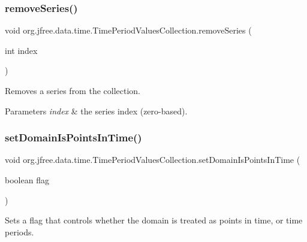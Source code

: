 \subsubsection{\texorpdfstring{remove\+Series()}{removeSeries()}\hspace{0.1cm}{\footnotesize\ttfamily [2/2]}}
{\footnotesize\ttfamily void org.\+jfree.\+data.\+time.\+Time\+Period\+Values\+Collection.\+remove\+Series (\begin{DoxyParamCaption}\item[{int}]{index }\end{DoxyParamCaption})}

Removes a series from the collection.


\begin{DoxyParams}{Parameters}
{\em index} & the series index (zero-\/based). \\
\hline
\end{DoxyParams}
\mbox{\label{classorg_1_1jfree_1_1data_1_1time_1_1_time_period_values_collection_a6b02c47571098c6cec37871815af991a}} 
\subsubsection{\texorpdfstring{set\+Domain\+Is\+Points\+In\+Time()}{setDomainIsPointsInTime()}}
{\footnotesize\ttfamily void org.\+jfree.\+data.\+time.\+Time\+Period\+Values\+Collection.\+set\+Domain\+Is\+Points\+In\+Time (\begin{DoxyParamCaption}\item[{boolean}]{flag }\end{DoxyParamCaption})}

Sets a flag that controls whether the domain is treated as \textquotesingle{}points in time\textquotesingle{}, or time periods.


